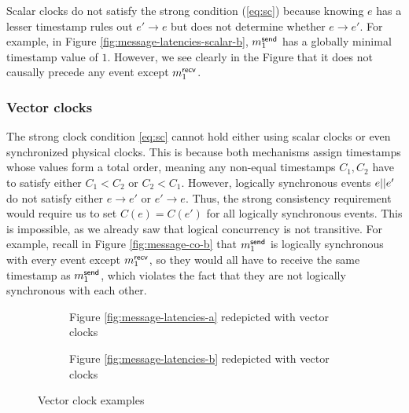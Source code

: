 \documentclass[]             %
{NASA}                       %
\theoremstyle{definition}
\begin{document}
Scalar clocks do not satisfy the strong condition (\ref{eq:sc})
because knowing $e$ has a lesser timestamp rules out $e' \to e$ but
does not determine whether $e \to e'$. For example, in Figure
\ref{fig:message-latencies-scalar-b}, $m_{1}^{\mathsf{send}}$ has a globally
minimal timestamp value of $1$. However, we see clearly in the Figure
that it does not causally precede any event except $m_{1}^{\mathsf{recv}}$.

\subsubsection{Vector clocks}
\label{sssec:vector-clocks}
\newcommand{\vt}{\textrm{vt}}

The strong clock condition \eqref{eq:sc} cannot hold either using
scalar clocks or even synchronized physical clocks. This is because
both mechanisms assign timestamps whose values form a total order, meaning any
non-equal timestamps $C_1, C_2$ have to satisfy either $C_1 < C_2$ or
$C_2 < C_1$. However, logically synchronous events $e || e'$ do not
satisfy either $e \to e'$ or $e' \to e$. Thus, the strong consistency
requirement would require us to set $C(e) = C(e')$ for all logically
synchronous events. This is impossible, as we already saw that logical
concurrency is not transitive. For example, recall in Figure
\ref{fig:message-co-b} that $m_{1}^{\mathsf{send}}$ is logically
synchronous with every event except $m_{1}^{\mathsf{recv}}$, so they would
all have to receive the same timestamp as $m_{1}^{\mathsf{send}}$, which
violates the fact that they are not logically synchronous with each
other.

\begin{figure}
  \setlength\belowcaptionskip{5ex}

  \begin{subfigure}{1\textwidth}
    \centering
    
    \caption{Figure \ref{fig:message-latencies-a} redepicted with vector clocks}
    \label{fig:message-latencies-vector-a}
  \end{subfigure}

  \vspace{4ex}

  \begin{subfigure}{1\textwidth}
    \centering 
    \caption{Figure \ref{fig:message-latencies-b} redepicted with vector clocks}
    \label{fig:message-latencies-vector-b}
  \end{subfigure}

  \caption{Vector clock examples}
  \label{fig:message-latencies-vector}
\end{figure}
\afterpage{\clearpage}
\end{document}
